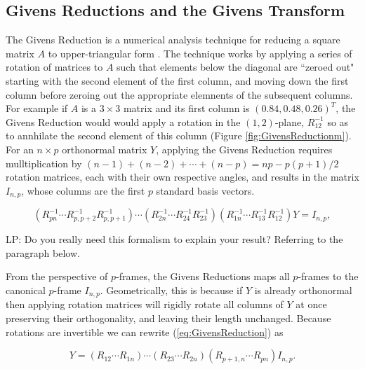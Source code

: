 \documentclass{article}
\newcommand{\commentLP}[1]{{\textcolor{commentLP_color}{LP: #1}}}
\begin{document}
\subsection{Givens Reductions and the Givens Transform}\label{GivensSub}
The Givens Reduction is a numerical analysis technique for reducing a square matrix $A$ to upper-triangular form \citep{meyer2000matrix}. The technique works by applying a series of rotation of matrices to $A$ such that elements below the diagonal are ``zeroed out" starting with the second element of the first column, and moving down the first column before zeroing out the appropriate elemnents of the subsequent columns. For example if $A$ is a $3 \times 3$ matrix and its first column is $(0.84, 0.48, 0.26)^T$, the Givens Reduction would would apply a rotation in the $(1,2)$-plane, $R_{12}^{-1}$ so as to annhilate the second element of this column (Figure \ref{fig:GivensReductionm}). For an $n \times p$ orthonormal matrix $Y$, applying the Givens Reduction requires mulltiplication by $(n-1)+(n-2)+\cdots+(n-p) = np -p(p+1)/2$ rotation matrices, each with their own respective angles, and results in the matrix$I_{n,p}$, whose columns are the first $p$ standard basis vectors.

\begin{equation}
\label{eq:GivensReduction}
(R_{pn}^{-1} \cdots R_{p,p+2}^{-1} R_{p,p+1}^{-1}) \cdots (R_{2n}^{-1} \cdots R_{24}^{-1} R_{23}^{-1})(R_{1n}^{-1} \cdots R_{13}^{-1}  R_{12}^{-1})Y = I_{n,p},
\end{equation}

\commentLP{Do you really need this formalism to explain your result? Referring to the paragraph below.}

From the perspective of $p$-frames, the Givens Reductions maps all $p$-frames to the canonical $p$-frame $I_{n,p}$. Geometrically, this is because if $Y$ is already orthonormal then applying rotation matrices will rigidly rotate all columns of $Y$ at once preserving their orthogonality, and leaving their length unchanged. Because rotations are invertible we can rewrite (\ref{eq:GivensReduction}) as

\begin{equation}
\label{eq:GivensRepresentation}
Y = (R_{12} \cdots R_{1n}) \cdots (R_{23} \cdots R_{2n}) (R_{p+1,n} \cdots R_{pn}) I_{n,p}.
\end{equation}
\end{document}
